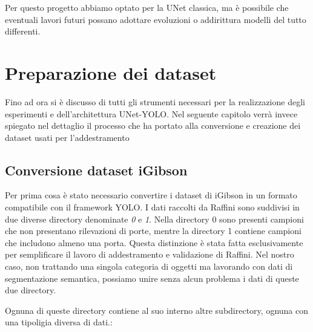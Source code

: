 \documentclass[12pt]{report}
\begin{document}
Per questo progetto abbiamo optato per la UNet classica, ma è possibile che eventuali lavori futuri possano adottare evoluzioni o addirittura modelli del tutto differenti.

\section{Preparazione dei dataset}
\label{sec:preparazione_dei_dataset}

Fino ad ora si è discusso di tutti gli strumenti necessari per la realizzazione degli esperimenti e dell'architettura UNet-YOLO. Nel seguente capitolo verrà invece spiegato nel dettaglio il processo che ha portato alla conversione e creazione dei dataset usati per l'addestramento

\subsection{Conversione dataset iGibson}
\label{sec:conversione_dataset_igibson}

Per prima cosa è stato necessario convertire i dataset di iGibson in un formato compatibile con il framework YOLO. I dati raccolti da Raffini sono suddivisi in due diverse directory denominate \textit{0} e \textit{1}. Nella directory 0 sono presenti campioni che non presentano rilevazioni di porte, mentre la directory 1 contiene campioni che includono almeno una porta. Questa distinzione è stata fatta esclusivamente per semplificare il lavoro di addestramento e validazione di Raffini. Nel nostro caso, non trattando una singola categoria di oggetti ma lavorando con dati di segmentazione semantica, possiamo unire senza alcun problema i dati di queste due directory. 

Ognuna di queste directory contiene al suo interno altre subdirectory, ognuna con una tipoligia diversa di dati.:
\end{document}
